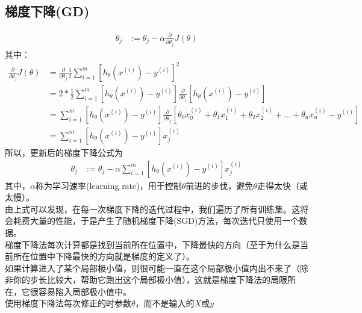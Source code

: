 \subsection{梯度下降(GD)}
\begin{equation}\begin{aligned}
      \theta_j &:= \theta_j - \alpha \frac{\partial} {\partial \theta_j} J(\theta)
\end{aligned}\end{equation}
其中：
\begin{equation}\begin{aligned}
      \frac{\partial} {\partial \theta_j} J(\theta) &= \frac{\partial}{\partial \theta_j} \frac{1}{2} \sum_{i=1}^m\left[ h_\theta(x^{(i)}) - y^{(i)} \right]^2 \\
      &= 2 * \frac{1}{2} \sum_{i=1}^m\left[ h_\theta(x^{(i)}) - y^{(i)} \right] \frac{\partial}{\partial\theta_j}\left[ h_\theta(x^{(i)}) - y^{(i)} \right] \\
      &= \sum_{i=1}^m\left[ h_\theta(x^{(i)}) - y^{(i)} \right]\frac{\partial}{\partial\theta_j}\left[ \theta_0x_0^{(i)} +  \theta_1x_1^{(i)} + \theta_2x_2^{(i)} + ... + \theta_nx_n^{(i)} - y^{(i)} \right] \\
      &= \sum_{i=1}^m\left[ h_\theta(x^{(i)}) - y^{(i)} \right]x_j^{(i)}
\end{aligned}\end{equation}
所以，更新后的梯度下降公式为
\begin{equation}\begin{aligned}
	\theta_j &:= \theta_j - \alpha \sum_{i=1}^m \left[ h_\theta(x^{(i)}) - y^{(i)} \right]x_j^{(i)}
\end{aligned}\end{equation}
其中，$\alpha$称为学习速率(learning rate)，用于控制$\theta$前进的步伐，避免$\theta$走得太快（或太慢）。\\
由上式可以发现，在每一次梯度下降的迭代过程中，我们遍历了所有训练集。这将会耗费大量的性能，于是产生了随机梯度下降(SGD)方法，每次迭代只使用一个数据。 \\
梯度下降法每次计算都是找到当前所在位置中，下降最快的方向（至于为什么是当前所在位置中下降最快的方向就是梯度的定义了）。 \\
如果计算进入了某个局部极小值，则很可能一直在这个局部极小值内出不来了（除非你的步长比较大，帮助它跑出这个局部极小值），这就是梯度下降法的局限所在，它很容易陷入局部极小值中。 \\
使用梯度下降法每次修正的时参数$\theta$，而不是输入的$X$或$y$

